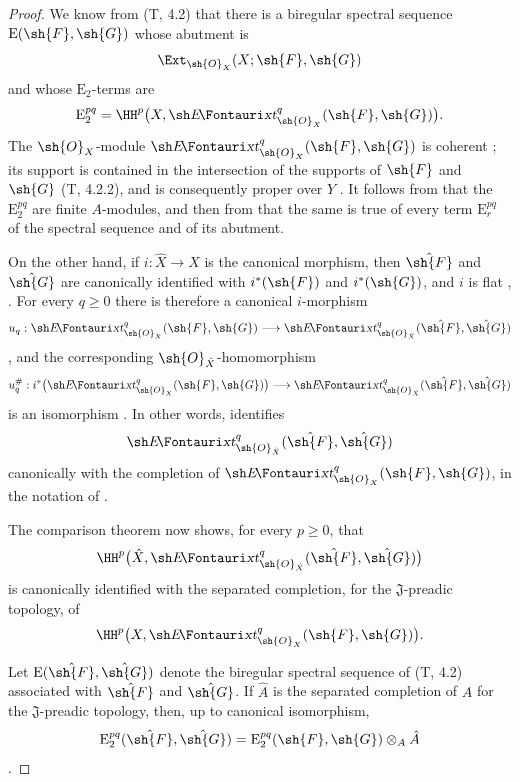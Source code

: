 \begin{proof}
We know from (T, 4.2) that there is a biregular spectral sequence
$\mathrm{E}(\sh{F},\sh{G})$ whose abutment is
\[
  \Ext_{\sh{O}_X}(X;\sh{F},\sh{G})
\]
and whose $\mathrm{E}_2$-terms are
\[
  \mathrm{E}_2^{pq}
  =\HH^p\bigl(X,\shExt^q_{\sh{O}_X}(\sh{F},\sh{G})\bigr).
\]
The $\sh{O}_X$-module
$\shExt^q_{\sh{O}_X}(\sh{F},\sh{G})$ is coherent
; its support is contained in the intersection of
the supports of $\sh{F}$ and $\sh{G}$ (T, 4.2.2), and is consequently
proper over $Y$ .  It follows from
 that the $\mathrm{E}_2^{pq}$ are finite
$A$-modules, and then from  that the same is true
of every term $\mathrm{E}_r^{pq}$ of the spectral sequence and of
its abutment.

On the other hand, if $i:\hat{X}\to X$ is the canonical morphism,
then $\hat{\sh{F}}$ and $\hat{\sh{G}}$ are canonically identified
with $i^*(\sh{F})$ and $i^*(\sh{G})$, and $i$ is flat
, .  For every $q\geq0$ there
is therefore a canonical $i$-morphism
\[
  u_q:\shExt^q_{\sh{O}_X}(\sh{F},\sh{G})
  \longrightarrow
  \shExt^q_{\sh{O}_{\hat{X}}}
    (\hat{\sh{F}},\hat{\sh{G}})
\]
, and the corresponding
$\sh{O}_{\hat{X}}$-homomorphism
\[
  u_q^\#:
  i^*\bigl(\shExt^q_{\sh{O}_X}(\sh{F},\sh{G})\bigr)
  \longrightarrow
  \shExt^q_{\sh{O}_{\hat{X}}}
    (\hat{\sh{F}},\hat{\sh{G}})
\]
is an isomorphism .  In other words,
 identifies
\[
  \shExt^q_{\sh{O}_{\hat{X}}}
    (\hat{\sh{F}},\hat{\sh{G}})
\]
canonically with the completion of
$\shExt^q_{\sh{O}_X}(\sh{F},\sh{G})$, in the notation of
.

The comparison theorem  now shows, for every
$p\geq0$, that
\[
  \HH^p\bigl(\hat{X},
    \shExt^q_{\sh{O}_{\hat{X}}}
      (\hat{\sh{F}},\hat{\sh{G}})\bigr)
\]
is canonically identified with the separated completion, for the
$\mathfrak J$-preadic topology, of
\[
  \HH^p\bigl(X,\shExt^q_{\sh{O}_X}(\sh{F},\sh{G})\bigr).
\]


Let $\mathrm{E}(\hat{\sh{F}},\hat{\sh{G}})$ denote the biregular
spectral sequence of (T, 4.2) associated with $\hat{\sh{F}}$ and
$\hat{\sh{G}}$.  If $\hat{A}$ is the separated completion of $A$ for
the $\mathfrak J$-preadic topology, then, up to canonical
isomorphism,
\[
  \mathrm{E}_2^{pq}(\hat{\sh{F}},\hat{\sh{G}})
  =
  \mathrm{E}_2^{pq}(\sh{F},\sh{G})\otimes_A\hat{A}
\]
.


\end{proof}

